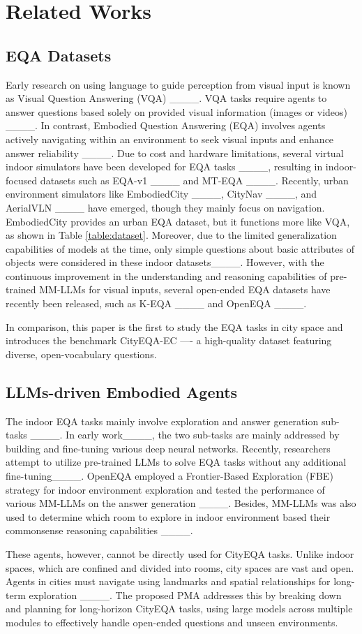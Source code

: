 \section{Related Works}
\label{related}

\subsection{EQA Datasets}
Early research on using language to guide perception from visual input is known as Visual Question Answering (VQA) ____. VQA tasks require agents to answer questions based solely on provided visual information (images or videos) ____. In contrast, Embodied Question Answering (EQA) involves agents actively navigating within an environment to seek visual inputs and enhance answer reliability ____. Due to cost and hardware limitations, several virtual indoor simulators have been developed for EQA tasks ____, resulting in indoor-focused datasets such as EQA-v1 ____ and MT-EQA ____. Recently, urban environment simulators like EmbodiedCity ____, CityNav ____, and AerialVLN ____ have emerged, though they mainly focus on navigation. EmbodiedCity provides an urban EQA dataset, but it functions more like VQA, as shown in Table \ref{table:dataset}. Moreover, due to the limited generalization capabilities of models at the time, only simple questions about basic attributes of objects were considered in these indoor datasets____. However, with the continuous improvement in the understanding and reasoning capabilities of pre-trained MM-LLMs for visual inputs, several open-ended EQA datasets have recently been released, such as K-EQA ____ and OpenEQA ____.

In comparison, this paper is the first to study the EQA tasks in city space and introduces the benchmark CityEQA-EC ---- a high-quality dataset featuring diverse, open-vocabulary questions.


\subsection{LLMs-driven Embodied Agents}

The indoor EQA tasks mainly involve exploration and answer generation sub-tasks ____. In early work____, the two sub-tasks are mainly addressed by building and fine-tuning various deep neural networks. Recently, researchers attempt to utilize pre-trained LLMs to solve EQA tasks without any additional fine-tuning____. OpenEQA employed a Frontier-Based Exploration (FBE) strategy for indoor environment exploration and tested the performance of various MM-LLMs on the answer generation ____. Besides, MM-LLMs was also used to determine which room to explore in indoor environment based their commonsense reasoning capabilities ____.

These agents, however, cannot be directly used for CityEQA tasks. Unlike indoor spaces, which are confined and divided into rooms, city spaces are vast and open. Agents in cities must navigate using landmarks and spatial relationships for long-term exploration ____. The proposed PMA addresses this by breaking down and planning for long-horizon CityEQA tasks, using large models across multiple modules to effectively handle open-ended questions and unseen environments.